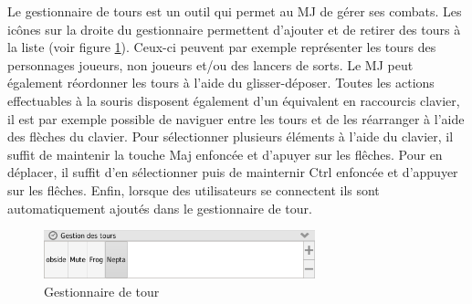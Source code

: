 Le gestionnaire de tours est un outil qui permet au MJ de gérer ses combats. Les icônes sur la droite du gestionnaire permettent d'ajouter et de retirer des tours à la liste (voir figure \ref{fig:turnManager}). Ceux-ci peuvent par exemple représenter les tours des personnages joueurs, non joueurs et/ou des lancers de sorts. Le MJ peut également réordonner les tours à l'aide du glisser-déposer. Toutes les actions effectuables à la souris disposent également d'un équivalent en raccourcis clavier, il est par exemple possible de naviguer entre les tours et de les réarranger à l'aide des flèches du clavier. Pour sélectionner plusieurs éléments à l'aide du clavier, il suffit de maintenir la touche Maj enfoncée et d'apuyer sur les flêches. Pour en déplacer, il suffit d'en sélectionner puis de mainternir Ctrl enfoncée et d'appuyer sur les flêches. Enfin, lorsque des utilisateurs se connectent ils sont automatiquement ajoutés dans le gestionnaire de tour.

\begin{figure}[h!]
	\centering
	\includegraphics[width=0.7\textwidth]{img/turn_manager.png}
	\caption{Gestionnaire de tour}
	\label{fig:turnManager}
\end{figure}